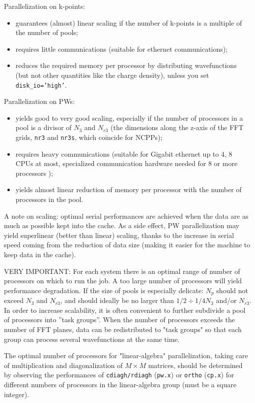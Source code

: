 \documentclass[12pt,a4paper]{article}
\def\pwx{\texttt{pw.x}}
\def\cpx{\texttt{cp.x}}
\begin{document}
Parallelization on k-points:
\begin{itemize}
\item guarantees (almost) linear scaling if the number of k-points
is a multiple of the number of pools;
\item requires little communications (suitable for ethernet communications);
\item reduces the required memory per processor by distributing wavefunctions
(but not other quantities like the charge density), unless you set 
\texttt{disk\_io='high'}.
\end{itemize}
Parallelization on PWs:
\begin{itemize}
\item yields good to very good scaling, especially if the number of processors
in a pool is a divisor of $N_3$ and $N_{r3}$ (the dimensions along the z-axis 
of the FFT grids, \texttt{nr3} and \texttt{nr3s}, which coincide for NCPPs);
\item requires heavy communications (suitable for Gigabit ethernet up to 
4, 8 CPUs at most, specialized communication hardware needed for 8 or more
processors );
\item yields almost linear reduction of memory per processor with the number
of processors in the pool.
\end{itemize}

A note on scaling: optimal serial performances are achieved when the data are
as much as possible kept into the cache. As a side effect, PW
parallelization may yield superlinear (better than linear) scaling,
thanks to the increase in serial speed coming from the reduction of data size 
(making it easier for the machine to keep data in the cache).

VERY IMPORTANT: For each system there is an optimal range of number of processors on which to 
run the job.  A too large number of processors will yield performance 
degradation. If the size of pools is especially delicate: $N_p$ should not 
exceed $N_3$ and $N_{r3}$, and should ideally be no larger than
$1/2\div1/4 N_3$ and/or $N_{r3}$. In order to increase scalability,
it is often convenient to 
further subdivide a pool of processors into ''task groups''.
When the number of processors exceeds the number of FFT planes, 
data can be redistributed to "task groups" so that each group 
can process several wavefunctions at the same time.

The optimal number of processors for "linear-algebra"
parallelization, taking care of multiplication and diagonalization 
of $M\times M$ matrices, should be determined by observing the
performances of \texttt{cdiagh/rdiagh} (\pwx) or \texttt{ortho} (\cpx)
for different numbers of processors in the linear-algebra group
(must be a square integer).
\end{document}
